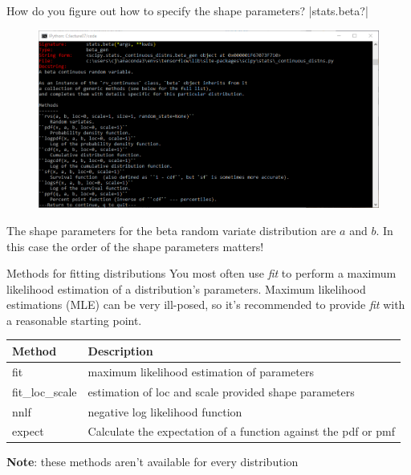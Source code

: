 \documentclass[10pt]{beamer}
\begin{document}

\begin{frame}[fragile]{How do you figure out how to specify the shape parameters?}
|stats.beta?|
\begin{figure}
\includegraphics[width=1.0\textwidth]{figs/betaDist.png}
\end{figure}
The shape parameters for the beta random variate distribution are $a$ and $b$. In this case the order of the shape parameters matters!
\end{frame}

\begin{frame}{Methods for fitting distributions}
You most often use \textit{fit} to perform a maximum likelihood estimation of a distribution's parameters. Maximum likelihood estimations (MLE) can be very ill-posed, so it's recommended to provide \textit{fit} with a reasonable starting point.
\begin{table}
\begin{tabular}{ll}
\textbf{Method} & \textbf{Description}  \\
\hline
    fit & maximum likelihood estimation of parameters\\
    fit\_loc\_scale & estimation of loc and scale provided shape parameters\\
    nnlf & negative log likelihood function\\
    expect & Calculate the expectation of a function against the pdf or pmf\\
\end{tabular}
\end{table}
\textbf{Note}: these methods aren't available for every distribution
\end{frame}
\end{document}
